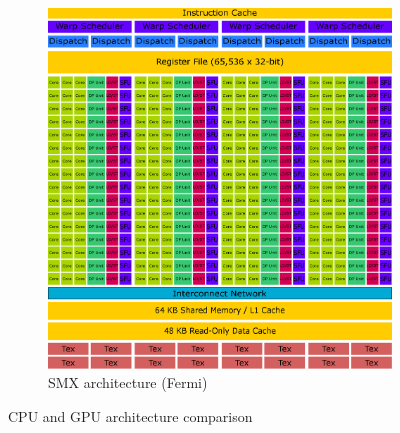 \begin{figure}[p]
\begin{subfigure}{0.6\textwidth}
  \centering
  \includegraphics[width=0.9\linewidth]{img/SMXArchitecture.eps}
  \caption{SMX architecture (Fermi)}
  \label{fig:smxarchitecture}
\end{subfigure}%
\caption{CPU and GPU architecture comparison}
\end{figure}

